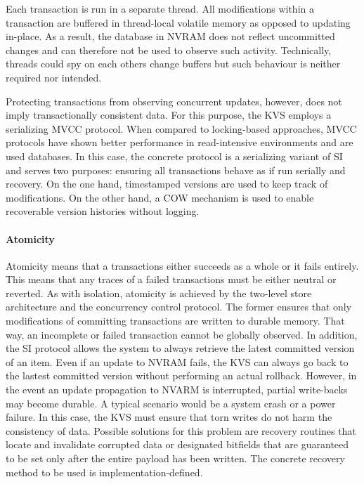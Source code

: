 Each transaction is run in a separate thread. All modifications within a
transaction are buffered in thread-local volatile memory as opposed to updating
in-place. As a result, the database in NVRAM does not reflect uncommitted
changes and can therefore not be used to observe such activity. Technically,
threads could spy on each others change buffers but such behaviour is neither
required nor intended.

Protecting transactions from observing concurrent updates, however, does not
imply transactionally consistent data. For this purpose, the KVS employs a
serializing MVCC protocol. When compared to locking-based approaches, MVCC
protocols have shown better performance in read-intensive environments and are
used databases. In this case, the concrete protocol is a serializing variant of
SI and serves two purposes: ensuring all transactions behave as if run serially
and recovery. On the one hand, timestamped versions are used to keep track of
modifications. On the other hand, a COW mechanism is used to enable recoverable
version histories without logging.


\paragraph{Atomicity}

Atomicity means that a transactions either succeeds as a whole or it fails
entirely. This means that any traces of a failed transactions must be either
neutral or reverted. As with isolation, atomicity is achieved by the two-level
store architecture and the concurrency control protocol. The former ensures that
only modifications of committing transactions are written to durable memory.
That way, an incomplete or failed transaction cannot be globally observed. In
addition, the SI protocol allows the system to always retrieve the latest
committed version of an item. Even if an update to NVRAM fails, the KVS can
always go back to the lastest committed version without performing an actual
rollback. However, in the event an update propagation to NVARM is interrupted,
partial write-backs may become durable. A typical scenario would be a system
crash or a power failure. In this case, the KVS must ensure that torn writes
do not harm the consistency of data. Possible solutions for this problem are
recovery routines that locate and invalidate corrupted data or designated
bitfields that are guaranteed to be set only after the entire payload has been
written. The concrete recovery method to be used is implementation-defined.

